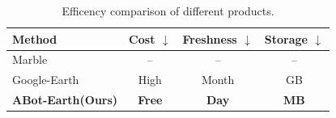 \begin{table}[h]
\centering
\caption{Efficency comparison of different products.}
\vspace{-0.5em}
\label{tab:large_scale_efficiency}
\begin{tabular}{l c c c}
\toprule
Method & Cost $\downarrow$ & Freshness $\downarrow$ & Storage $\downarrow$ \\
\midrule
Marble & -- & -- & -- \\
Google-Earth & High & Month & GB \\
\textbf{ABot-Earth(Ours)} & \textbf{Free} & \textbf{Day} & \textbf{MB} \\
\bottomrule
\end{tabular}
\end{table}